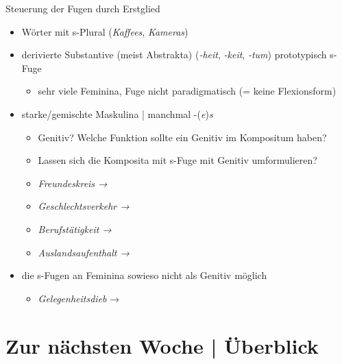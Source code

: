 \begin{frame}
  {Steuerung der Fugen durch Erstglied}
  \onslide<+->
  \begin{itemize}[<+->]
    \item Wörter mit s-Plural (\textit{Kaffees}, \textit{Kameras}) 
      \Halbzeile
    \item \alert{derivierte} Substantive (meist Abstrakta) (\textit{-heit}, \textit{-keit}, \textit{-tum}) \alert{prototypisch s-Fuge}
      \begin{itemize}[<+->]
        \item sehr viele Feminina, Fuge nicht paradigmatisch (= keine Flexionsform)
      \end{itemize}
      \Halbzeile
    \item starke\slash gemischte Maskulina | manchmal -(\textit{e})\textit{s}
      \begin{itemize}[<+->]
        \item Genitiv? Welche Funktion sollte ein Genitiv im Kompositum haben?
        \item Lassen sich die Komposita mit s-Fuge mit Genitiv umformulieren?
        \item \textit{Freundeskreis → }
        \item \textit{Geschlechtsverkehr → }
        \item \textit{Berufstätigkeit → }
        \item \textit{Auslandsaufenthalt → }
      \end{itemize}
    \Halbzeile
  \item die s-Fugen an \alert{Feminina} sowieso nicht als Genitiv möglich
      \begin{itemize}
        \item \textit{Gelegenheitsdieb} → 
      \end{itemize}
  \end{itemize}
\end{frame}

\ifdefined\TITLE
  \section{Zur nächsten Woche | Überblick}


